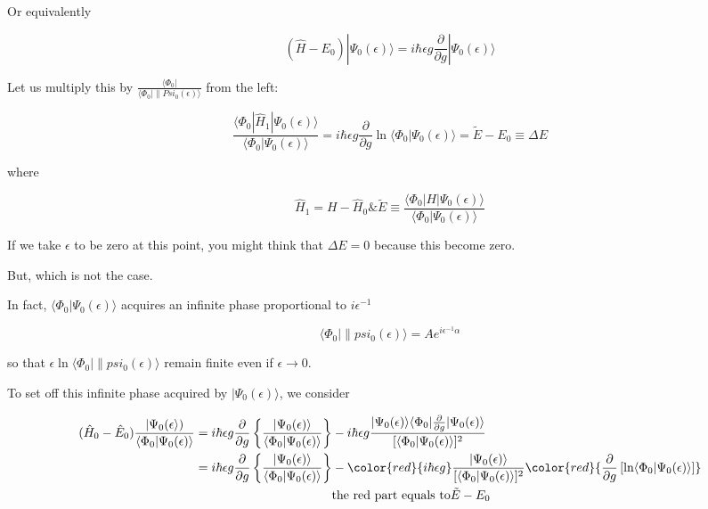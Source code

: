 Or equivalently

\[(\hat{H}-E_0)|\Psi_0(\epsilon)\rangle = i\hbar\epsilon g\frac{\partial}{\partial g}|\Psi_0(\epsilon)\rangle \]

Let us multiply this by $\displaystyle\frac{\langle\Phi_0|}{\langle\Phi_0|\|Psi_0(\epsilon)\rangle}$ from the left: 

\[\frac{\langle\Phi_0|\hat{H}_1|\Psi_0(\epsilon)\rangle}{\langle\Phi_0|\Psi_0(\epsilon)\rangle} = i\hbar\epsilon g\frac{\partial}{\partial g}\ln\langle\Phi_0|\Psi_0(\epsilon)\rangle = \tilde{E}-E_0\equiv\Delta E \]

where

\[\hat{H}_1 = H-\hat{H}_0 \& \tilde{E} \equiv\frac{\langle\Phi_0|H|\Psi_0(\epsilon)\rangle}{\langle\Phi_0|\Psi_0(\epsilon)\rangle} \]

If we take $\epsilon$ to be zero at this point, you might think that $\Delta E=0$ because this become zero. 

But, which is not the case. 

In fact, $\langle\Phi_0|\Psi_0(\epsilon)\rangle$ acquires an infinite phase proportional to $i\epsilon^{-1}$

\[\langle\Phi_0|\|psi_0(\epsilon)\rangle = A e^{i\epsilon^{-1}\alpha} \]

so that $\epsilon \ln \langle\Phi_0|\|psi_0(\epsilon)\rangle$ remain finite even if $\epsilon\to0$. 

To set off this infinite phase acquired by $|\Psi_0(\epsilon)\rangle$, we consider

\[
\begin{split}
(\hat{H}_0-\hat{E}_0)\frac{|\Psi_0(\epsilon\rangle)}{\langle\Phi_0|\Psi_0(\epsilon)\rangle} &= i\hbar\epsilon g\frac{\partial}{\partial g}\left\{\frac{|\Psi_0(\epsilon)\rangle}{\langle\Phi_0|\Psi_0(\epsilon)\rangle}\right\} - i\hbar\epsilon g\frac{|\Psi_0(\epsilon)\rangle\langle\Phi_0|\frac{\partial}{\partial g}|\Psi_0(\epsilon)\rangle}{[\langle\Phi_0|\Psi_0(\epsilon)\rangle]^2}\\
&=i\hbar\epsilon g\frac{\partial}{\partial g}\left\{\frac{|\Psi_0(\epsilon)\rangle}{\langle\Phi_0|\Psi_0(\epsilon)\rangle}\right\} - {{\color{red}{i\hbar\epsilon g}}}\frac{|\Psi_0(\epsilon)\rangle}{[\langle\Phi_0|\Psi_0(\epsilon)\rangle]^2}{{\color{red}{\frac{\partial}{\partial g}\left[\text{ln} \langle\Phi_0|\Psi_0(\epsilon)\rangle\right]}}}\\
&\quad\quad\quad\quad\quad\quad\quad\quad\quad\quad\quad{\text{the red part equals to}} \tilde{E}-E_0
\end{split}
\]

